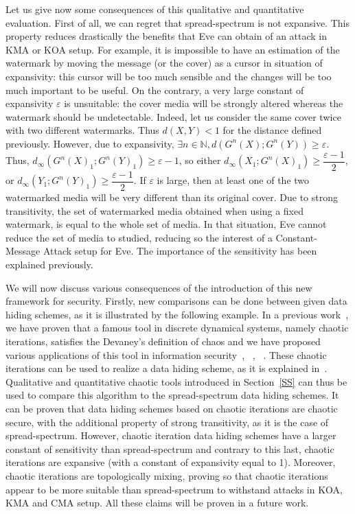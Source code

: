 \documentclass{llncs}
\begin{document}
Let us give now some consequences of this qualitative and quantitative evaluation. First of all, we can regret that spread-spectrum is not expansive. This property reduces drastically the benefits that Eve can obtain of an attack in KMA or KOA setup. For example, it is impossible to have an estimation of the watermark by moving the message (or the cover) as a cursor in situation of expansivity: this cursor will be too much sensible and the changes will be too much important to be useful. 
On the contrary, a very large constant of expansivity $\varepsilon$ is unsuitable: the cover media will be strongly altered whereas the watermark should be undetectable. Indeed, let us consider the same cover twice with two different watermarks. Thus $d(X,Y) < 1$ for the distance defined previously. However, due to expansivity, $\exists n \in \mathds{N}, d\left(G^n (X) ; G^n (Y) \right) \geqslant \varepsilon.$ Thus, $d_\infty \left(G^n (X)_1 ; G^n (Y)_1 \right) \geqslant \varepsilon - 1$, so either $d_\infty \left(X_1 ; G^n (X)_1 \right) \geqslant \dfrac{\varepsilon - 1}{2}$, or $d_\infty \left(Y_1 ; G^n (Y)_1 \right) \geqslant \dfrac{\varepsilon - 1}{2}$. If $\varepsilon$ is large, then at least one of the two watermarked media will be very different than its original cover.
Due to strong transitivity, the set of watermarked media obtained when using a fixed watermark, is equal to the whole set of media. In that situation, Eve cannot reduce the set of media to studied, reducing so the interest of a Constant-Message Attack setup for Eve. The importance of the sensitivity has been explained previously.

We will now discuss various consequences of the introduction of this new framework for security. Firstly, new comparisons can be done between given data hiding schemes, as it is illustrated by the following example. In a previous work~\cite{guyeux10}, we have proven that a famous tool in discrete dynamical systems, namely chaotic iterations, satisfies the Devaney's definition of chaos and we have proposed various applications of this tool in information security~\cite{internet09}, ~\cite{guyeux09}, ~\cite{guyeux10}. These chaotic iterations can be used to realize a data hiding scheme, as it is explained in~\cite{arxiv}. Qualitative and quantitative chaotic tools introduced in Section~\ref{SS} can thus be used to compare this algorithm to the spread-spectrum data hiding schemes. It can be proven that data hiding schemes based on chaotic iterations are chaotic secure, with the additional property of strong transitivity, as it is the case of spread-spectrum. However, chaotic iteration data hiding schemes have a larger constant of sensitivity than spread-spectrum and contrary to this last, chaotic iterations are expansive (with a constant of expansivity equal to 1). Moreover, chaotic iterations are topologically mixing, proving so that chaotic iterations appear to be more suitable than spread-spectrum to withstand attacks in KOA, KMA and CMA setup. All these claims will be proven in a future work.
\end{document}
